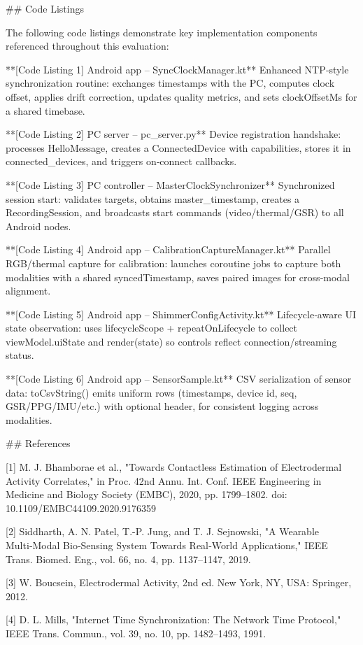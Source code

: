 \documentclass[12pt,a4paper]{article}
\begin{document}
{## Code Listings

The following code listings demonstrate key implementation components referenced throughout this evaluation:

**[Code Listing 1] Android app – SyncClockManager.kt**  
Enhanced NTP‑style synchronization routine: exchanges timestamps with the PC, computes clock offset, applies drift correction, updates quality metrics, and sets clockOffsetMs for a shared timebase.

**[Code Listing 2] PC server – pc_server.py**  
Device registration handshake: processes HelloMessage, creates a ConnectedDevice with capabilities, stores it in connected_devices, and triggers on‑connect callbacks.

**[Code Listing 3] PC controller – MasterClockSynchronizer**  
Synchronized session start: validates targets, obtains master_timestamp, creates a RecordingSession, and broadcasts start commands (video/thermal/GSR) to all Android nodes.

**[Code Listing 4] Android app – CalibrationCaptureManager.kt**  
Parallel RGB/thermal capture for calibration: launches coroutine jobs to capture both modalities with a shared syncedTimestamp, saves paired images for cross‑modal alignment.

**[Code Listing 5] Android app – ShimmerConfigActivity.kt**  
Lifecycle‑aware UI state observation: uses lifecycleScope + repeatOnLifecycle to collect viewModel.uiState and render(state) so controls reflect connection/streaming status.

**[Code Listing 6] Android app – SensorSample.kt**  
CSV serialization of sensor data: toCsvString() emits uniform rows (timestamps, device id, seq, GSR/PPG/IMU/etc.) with optional header, for consistent logging across modalities.

## References

[1] M. J. Bhamborae et al., "Towards Contactless Estimation of Electrodermal Activity Correlates," in Proc. 42nd Annu. Int. Conf. IEEE Engineering in Medicine and Biology Society (EMBC), 2020, pp. 1799–1802. doi: 10.1109/EMBC44109.2020.9176359

[2] Siddharth, A. N. Patel, T.-P. Jung, and T. J. Sejnowski, "A Wearable Multi‑Modal Bio‑Sensing System Towards Real‑World Applications," IEEE Trans. Biomed. Eng., vol. 66, no. 4, pp. 1137–1147, 2019.

[3] W. Boucsein, Electrodermal Activity, 2nd ed. New York, NY, USA: Springer, 2012.

[4] D. L. Mills, "Internet Time Synchronization: The Network Time Protocol," IEEE Trans. Commun., vol. 39, no. 10, pp. 1482–1493, 1991.

}
\end{document}
